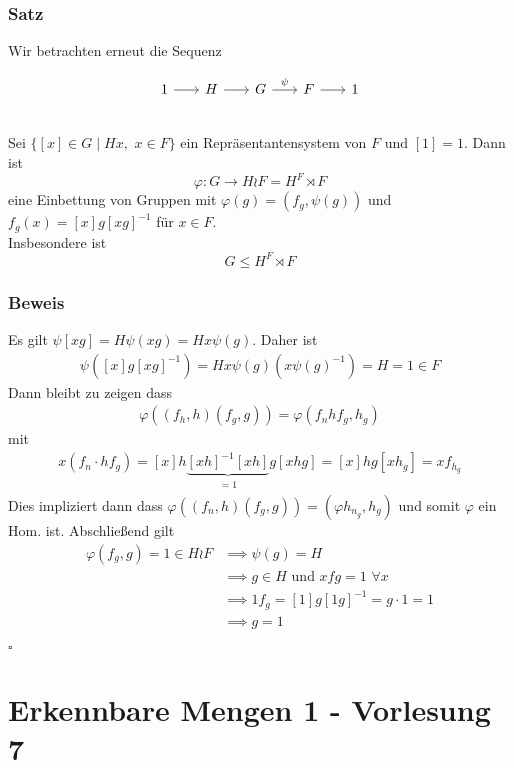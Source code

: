 \documentclass[12pt, german]{article}
\newcommand{\bewiesen}{
	
	\begin{flushright}
		$\square$  \\
\end{flushright}}
\begin{document}
	\subsubsection{Satz}
	Wir betrachten erneut die Sequenz 
	\begin{figure}[h!]
		\centering
		\begin{equation*}
			\begin{tikzcd}[column sep=1.5pc]
				1 \arrow{r}{} & H \arrow{r}{} & G \arrow{r}{\psi} & F \arrow{r}{} & 1
			\end{tikzcd}
		\end{equation*}
	\end{figure} \\ 
	Sei $\{[x] \in G \mid Hx, \, \, x \in F\}$ ein Repräsentantensystem von $F$ und $[1] = 1$. 
	Dann ist $$\varphi: G \to H \wr F = H^F \rtimes F$$ eine Einbettung von Gruppen mit $\varphi(g) = (f_g, \psi(g))$ und $f_g(x) = [x]g[xg]^{-1}$ für $x \in F$. \\  Insbesondere ist $$G \leq H^F \rtimes F$$
	
	\subsubsection{Beweis}
	Es gilt $\psi[xg] = H\psi(xg) = Hx\psi(g)$. Daher ist
	\begin{align*}
		\psi([x]g[xg]^{-1}) = Hx\psi(g)(x\psi(g)^{-1}) = H = 1 \in F
	\end{align*}
	Dann bleibt zu zeigen dass 
	\begin{align*}
		\varphi((f_h, h)(f_g, g)) = \varphi(f_nhf_g, h_g) 
	\end{align*}
	mit 
	\begin{align*}
		x(f_n \cdot hf_g) = [x]h\underbrace{[xh]^{-1}[xh]}_{\substack{=1}}g[xhg] = [x]hg[xh_g] = xf_{h_g}
	\end{align*}
	Dies impliziert dann dass $\varphi((f_n, h)(f_g,g)) = (\varphi h_{n_g}, h_g)$ und somit $\varphi$ ein Hom. ist. 
	Abschließend gilt 
	\begin{align*}
		\varphi(f_g, g) = 1 \in H \wr F &\implies \psi(g) = H \\
		&\implies g \in H \text{ und } xfg = 1 \, \, \forall x \\ 
		&\implies 1f_g = [1]g[1g]^{-1} = g \cdot 1 = 1 \\
		&\implies g = 1
	\end{align*}
	\bewiesen
	
	\section{Erkennbare Mengen 1 - Vorlesung 7}
\end{document}
